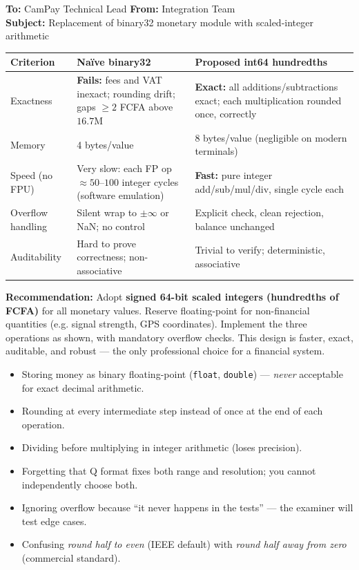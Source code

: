 \documentclass[11pt]{article}
\begin{document}
\begin{aretenir}

\textbf{To:} CamPay Technical Lead \hfill \textbf{From:} Integration Team \\
\textbf{Subject:} Replacement of binary32 monetary module with scaled-integer arithmetic

\begin{tabularx}{\linewidth}{|l|X|X|}\hline
\rowcolor{popblueL} \textbf{Criterion} & \textbf{Na\"ive binary32} & \textbf{Proposed int64 hundredths} \\ \hline
Exactness & \textbf{Fails:} fees and VAT inexact; rounding drift; gaps $\ge 2$ FCFA above $16.7$M & \textbf{Exact:} all additions/subtractions exact; each multiplication rounded once, correctly \\ \hline
Memory & 4 bytes/value & 8 bytes/value (negligible on modern terminals) \\ \hline
Speed (no FPU) & Very slow: each FP op $\approx 50$--$100$ integer cycles (software emulation) & \textbf{Fast:} pure integer add/sub/mul/div, single cycle each \\ \hline
Overflow handling & Silent wrap to $\pm\infty$ or NaN; no control & Explicit check, clean rejection, balance unchanged \\ \hline
Auditability & Hard to prove correctness; non-associative & Trivial to verify; deterministic, associative \\ \hline
\end{tabularx}

\textbf{Recommendation:} Adopt \textbf{signed 64-bit scaled integers (hundredths of FCFA)} for all monetary values. Reserve floating-point for non-financial quantities (e.g. signal strength, GPS coordinates). Implement the three operations as shown, with mandatory overflow checks. This design is faster, exact, auditable, and robust — the only professional choice for a financial system.
\end{aretenir}

\begin{attention}
\begin{itemize}
\item Storing money as binary floating-point (\texttt{float}, \texttt{double}) — \emph{never} acceptable for exact decimal arithmetic.
\item Rounding at every intermediate step instead of once at the end of each operation.
\item Dividing before multiplying in integer arithmetic (loses precision).
\item Forgetting that Q format fixes both range and resolution; you cannot independently choose both.
\item Ignoring overflow because ``it never happens in the tests'' — the examiner will test edge cases.
\item Confusing \emph{round half to even} (IEEE default) with \emph{round half away from zero} (commercial standard).
\end{itemize}
\end{attention}
\end{document}
